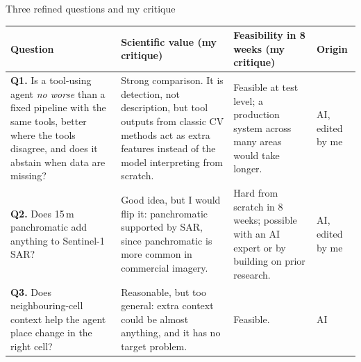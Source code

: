 \documentclass[aspectratio=169,11pt]{beamer}
\begin{document}
\begin{frame}[shrink=20]{Three refined questions and my critique}
\footnotesize
\begin{tabularx}{\textwidth}{@{}p{3.3cm}YYp{1.9cm}@{}}
\toprule
\textbf{Question} & \textbf{Scientific value (my critique)} & \textbf{Feasibility in 8 weeks (my critique)} & \textbf{Origin} \\
\midrule
\textbf{Q1.} Is a tool-using agent \emph{no worse} than a fixed pipeline with the same tools, better where the tools disagree, and does it abstain when data are missing?
 & Strong comparison. It is detection, not description, but tool outputs from classic CV methods act as extra features instead of the model interpreting from scratch.
 & Feasible at test level; a production system across many areas would take longer.
 & AI, edited by me \\
\addlinespace
\textbf{Q2.} Does 15\,m panchromatic add anything to Sentinel-1 SAR?
 & Good idea, but I would flip it: \alert{panchromatic supported by SAR}, since panchromatic is more common in commercial imagery.
 & Hard from scratch in 8 weeks; possible with an AI expert or by building on prior research.
 & AI, edited by me \\
\addlinespace
\textbf{Q3.} Does neighbouring-cell context help the agent place change in the right cell?
 & Reasonable, but too general: extra context could be almost anything, and it has no target problem.
 & Feasible.
 & AI \\
\bottomrule
\end{tabularx}
\end{frame}
\end{document}
